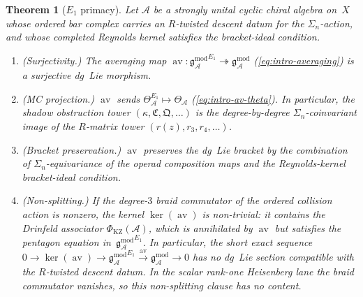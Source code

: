\documentclass[11pt]{report}
\newtheorem{theorem}{Theorem}[section]
\theoremstyle{definition}
\theoremstyle{remark}
\providecommand{\cA}{\mathcal{A}}
\providecommand{\gAmod}{\mathfrak{g}^{\mathrm{mod}}_\cA}
\providecommand{\Eone}{E_1}
\numberwithin{equation}{section}
\begin{document}
\begin{theorem}[$\Eone$ primacy]
\label{thm:e1-primacy}
\index{primacy thesis!E1@$\Eone$|textbf}
Let\/ $\cA$ be a strongly unital cyclic chiral algebra on\/~$X$ whose
ordered bar complex carries an \(R\)-twisted descent datum for the
\(\Sigma_n\)-action, and whose completed Reynolds kernel satisfies the
bracket-ideal condition.
\begin{enumerate}[label=\textup{(\roman*)}]
\item \textup{(Surjectivity.)}
 The averaging map
 $\operatorname{av}\colon {\gAmod}^{\Eone}
 \twoheadrightarrow \gAmod$
 \textup{(}\eqref{eq:intro-averaging}\textup{)}
 is a surjective dg~Lie morphism.
\item \textup{(MC projection.)}
 $\operatorname{av}$ sends
 $\Theta_\cA^{\Eone} \mapsto \Theta_\cA$
 \textup{(}\eqref{eq:intro-av-theta}\textup{)}.
 In particular, the shadow obstruction tower
 $(\kappa, \mathfrak{C}, \mathfrak{Q}, \ldots)$
 is the degree-by-degree $\Sigma_n$-coinvariant image of the
 $R$-matrix tower $(r(z), r_3, r_4, \ldots)$.
\item \textup{(Bracket preservation.)}
 $\operatorname{av}$ preserves the dg~Lie bracket by the combination
 of $\Sigma_n$-equivariance of the operad composition maps and the
 Reynolds-kernel bracket-ideal condition.
\item \textup{(Non-splitting.)}
 If the degree-$3$ braid commutator of the ordered collision action is
 nonzero, the kernel\/ $\ker(\operatorname{av})$ is non-trivial:
 it contains the Drinfeld associator
 $\Phi_{\mathrm{KZ}}(\cA)$, which is
 annihilated by\/ $\operatorname{av}$ but satisfies the
 pentagon equation in\/~${\gAmod}^{\Eone}$.
 In particular, the short exact sequence
 $0 \to \ker(\operatorname{av}) \to {\gAmod}^{\Eone}
 \xrightarrow{\operatorname{av}} \gAmod \to 0$
 has no dg~Lie section compatible with the \(R\)-twisted descent
 datum. In the scalar rank-one Heisenberg lane the braid commutator
 vanishes, so this non-splitting clause has no content.
\end{enumerate}
\end{theorem}
\end{document}
